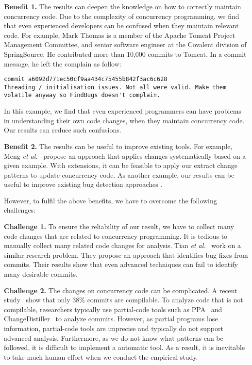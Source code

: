 \noindent
\textbf{Benefit 1.} The results can deepen the knowledge on how to correctly maintain concurrency code. Due to the complexity of concurrency programming, we find that even experienced developers can be confused when they maintain relevant code. For example, Mark Thomas is a member of the Apache Tomcat Project Management Committee, and senior software engineer at the Covalent division of SpringSource. He contributed more than 10,000 commits to Tomcat. In a commit message, he left the complain as follow:

\lstset{numbers=left, breaklines=true,  basicstyle=\ttfamily\tiny,  xleftmargin=3em, tabsize=2}
\begin{lstlisting}
commit a6092d771ec50cf9aa434c75455b842f3ac6c628
Threading / initialisation issues. Not all were valid. Make them volatile anyway so FindBugs doesn't complain.
\end{lstlisting}

\noindent
In this example, we find that even experienced programmers can have problems in understanding their own code changes, when they maintain concurrency code. Our results can reduce such confusions.


\noindent
\textbf{Benefit 2.} The results can be useful to improve existing tools. For example, Meng \emph{et al.}~\cite{conf/pldi/MengKM11} propose an approach that applies changes systematically based on a given example. With extensions, it can be feasible to apply our extract change patterns to update concurrency code. As another example, our results can be useful to improve existing bug detection approaches \cite{conf/ppopp/SamakR14, conf/sigsoft/EslamimehrP14}.

However, to fulfil the above benefits, we have to overcome the following challenges:

\noindent
\textbf{Challenge 1.} To ensure the reliability of our result, we have to collect many code changes that are related to concurrency programming. It is tedious to manually collect many related code changes for analysis. Tian \emph{et al.}~\cite{tian2012identifying} work on a similar research problem. They propose an approach that identifies bug fixes from commits. Their results show that even advanced techniques can fail to identify many desirable commits. 


\noindent
\textbf{Challenge 2.} The changes on concurrency code can be complicated. A recent study~\cite{tufano2016there} show that only 38\% commits are compilable. To analyze code that is not compilable, researchers typically use partial-code tools such as PPA~\cite{DagenaisH08ppa} and ChangeDistiller~\cite{fluri2007change} to analyze commits. However, as partial programs lose information, partial-code tools are imprecise and typically do not support advanced analysis. Furthermore, as we do not know what patterns can be followed, it is difficult to implement a automatic tool. As a result, it is inevitable to take much human effort when we conduct the empirical study. 

